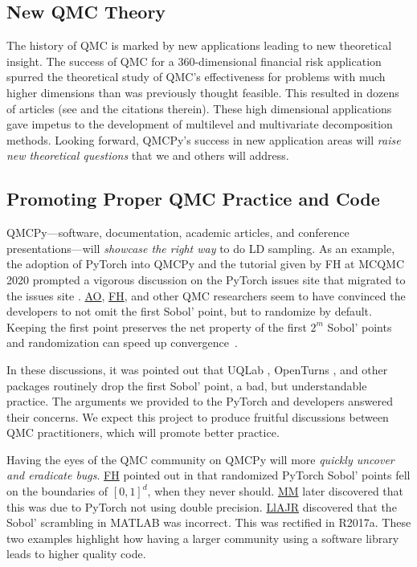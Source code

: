 \documentclass[11pt]{NSFamsart}
\newcommand{\FH}{\hyperlink{FHlink}{FH}\xspace}
\newcommand{\AO}{\hyperlink{AOlink}{AO}\xspace}
\newcommand{\MM}{\hyperlink{MMlink}{MM}\xspace}
\newcommand{\LlAJR}{\hyperlink{LlAJRlink}{LlAJR}\xspace}
\begin{document}
\subsection{New QMC Theory}
The history of QMC is marked by new applications leading to new theoretical insight.  The success of QMC for a $360$-dimensional financial risk application \cite{PasTra95} spurred the theoretical study of QMC's effectiveness for problems with much higher dimensions than was previously thought feasible.  This resulted in dozens of articles (see \cite{NovWoz10a,DicEtal14a} and the citations therein).  These high dimensional applications gave impetus to the development of multilevel \cite{Gil15a} and multivariate decomposition \cite{KuoEtal17a} methods. Looking forward, QMCPy's success in new application areas will \emph{raise new theoretical questions} that we and others will address.

\subsection{Promoting Proper QMC Practice and Code}
QMCPy---software, documentation, academic articles, and conference presentations---will \emph{showcase the right way} to do LD sampling.  As an example, the adoption of PyTorch into QMCPy and the tutorial given by FH at MCQMC 2020 \cite{MCQMC2020QMCPyTut} prompted a vigorous discussion on the PyTorch issues site \cite{PyTorchFirstPt2020a} that migrated to the  issues site \cite{scipySobol2020a}.  \AO, \FH, and other QMC researchers seem to have convinced the developers to not omit the first Sobol' point, but to randomize by default.  Keeping the first point preserves the net property of the first $2^m$ Sobol' points and randomization can speed up convergence~\cite{owen2020dropping}.

In these discussions, it was pointed out that UQLab \cite{UQLab2014}, OpenTurns \cite{OpenTURNS}, and other packages routinely drop the first Sobol' point, a bad, but understandable practice.  The arguments we provided to the PyTorch and  developers answered their concerns.  We expect this project to produce fruitful discussions between QMC practitioners, which will promote better practice.

Having the eyes of the QMC community on QMCPy will more \emph{quickly uncover and eradicate bugs}.  \FH  pointed out in \cite{PyTorchFirstPt2020a} that randomized PyTorch Sobol' points fell on the boundaries of $[0,1]^d$, when they never should.  \MM later discovered that this was due to PyTorch not using double precision.  \LlAJR discovered that the  Sobol' scrambling in MATLAB was incorrect.  This was rectified in R2017a.  These two examples highlight how having a larger community using a software library leads to higher quality code.
\end{document}
